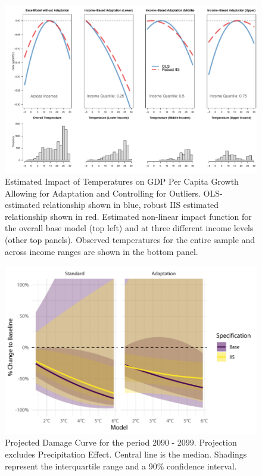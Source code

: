 \documentclass[11pt, letterpaper]{article}
\numberwithin{algorithm}{section}
\numberwithin{assumption}{section}
\numberwithin{lemma}{section}
\numberwithin{theorem}{section}
\numberwithin{corollary}{section}
\numberwithin{remark}{section}
\numberwithin{equation}{section}
\numberwithin{figure}{section}
\numberwithin{table}{section}
\begin{document}
\begin{figure}[!htbp]  %
\centering
\includegraphics[width = \textwidth]{eff.adapt.v2.pdf}
\caption{Estimated Impact of Temperatures on GDP Per Capita Growth Allowing for Adaptation and Controlling for Outliers. OLS-estimated relationship shown in blue, robust IIS estimated relationship shown in red. Estimated non-linear impact function for the overall base model (top left) and at three different income levels (other top panels). Observed temperatures for the entire sample and across income ranges are shown in the bottom panel. }
\label{fig_dist_app1}
\end{figure}






\begin{figure}[!htbp]  \vspace{-.35in}
\centering
\includegraphics[width = \textwidth]{projections_noprcp_main.pdf}
\caption{Projected Damage Curve for the period 2090 - 2099. Projection excludes Precipitation Effect. Central line is the median. Shadings represent the interquartile range and a 90\% confidence interval.}
\label{fig_projection}
\end{figure}
\end{document}
